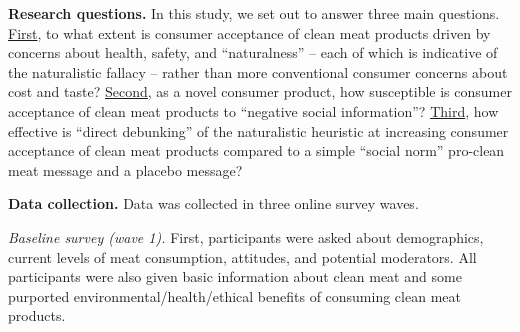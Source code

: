 \documentclass[12pt]{article}
\begin{document}
\textbf{Research questions.} In this study, we set out to answer three main questions. \underline{First}, to what extent is consumer acceptance of clean meat products driven by concerns about health, safety, and ``naturalness'' -- each of which is indicative of the naturalistic fallacy -- rather than more conventional consumer concerns about cost and taste? \underline{Second}, as a novel consumer product, how susceptible is consumer acceptance of clean meat products to ``negative social information''? \underline{Third}, how effective is ``direct debunking'' of the naturalistic heuristic at increasing consumer acceptance of clean meat products compared to a simple ``social norm'' pro-clean meat message and a placebo message?



\textbf{Data collection.} Data was collected in three online survey waves.

\textit{Baseline survey (wave 1).} First, participants were asked about demographics, current levels of meat consumption, attitudes, and potential moderators. All participants were also given basic information about clean meat and some purported environmental/health/ethical benefits of consuming clean meat products.
\end{document}
